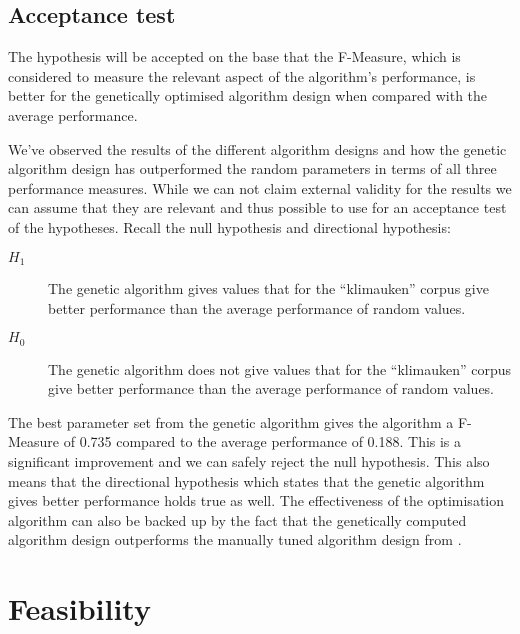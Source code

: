 \subsection{Acceptance test}
The hypothesis will be accepted on the base that the F-Measure, which is considered to measure the relevant aspect of the \CTC algorithm's performance, is better for the genetically optimised algorithm design when compared with the average performance.

We've observed the results of the different algorithm designs and how the genetic algorithm design has outperformed the random parameters in terms of all three performance measures. While we can not claim external validity for the results we can assume that they are relevant and thus possible to use for an acceptance test of the hypotheses. Recall the null hypothesis and directional hypothesis:

\begin{description}
	\item [\(H_{1}\)] The genetic algorithm gives values that for the ``klimauken'' corpus give better performance than the average performance of random values.
	\item [\(H_{0}\)] The genetic algorithm does not give values that for the ``klimauken'' corpus give better performance than the average performance of random values.
\end{description}

The best parameter set from the genetic algorithm gives the \CTC algorithm a F-Measure of 0.735 compared to the average performance of 0.188. This is a significant improvement and we can safely reject the null hypothesis. This also means that the directional hypothesis which states that the genetic algorithm gives better performance holds true as well. The effectiveness of the optimisation algorithm can also be backed up by the fact that the genetically computed algorithm design outperforms the manually tuned algorithm design from \cite{Moe2013compact}.

\section{Feasibility}

